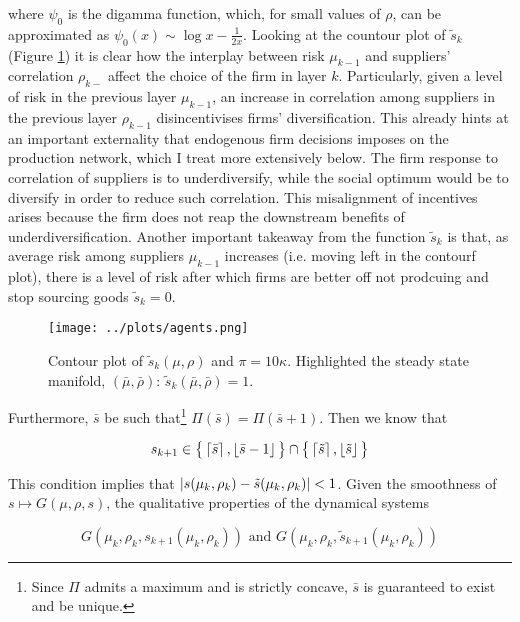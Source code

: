 \documentclass[../../main.tex]{subfiles}
\begin{document}
where $\psi_0$ is the digamma function, which, for small values of $\rho$, can be approximated as $\psi_0(x) \sim \log x - \frac{1}{2x}$. Looking at the countour plot of $\tilde{s}_k$ (Figure \ref{fig:agents-optimum}) it is clear how the interplay between risk $\mu_{k - 1}$ and suppliers' correlation $\rho_{k - }$ affect the choice of the firm in layer $k$. Particularly, given a level of risk in the previous layer $\mu_{k - 1}$, an increase in correlation among suppliers in the previous layer $\rho_{k - 1}$ disincentivises firms' diversification. This already hints at an important externality that endogenous firm decisions imposes on the production network, which I treat more extensively below. The firm response to correlation of suppliers is to underdiversify, while the social optimum would be to diversify in order to reduce such correlation. This misalignment of incentives arises because the firm does not reap the downstream benefits of underdiversification. Another important takeaway from the function $\tilde{s}_k$ is that, as average risk among suppliers $\mu_{k - 1}$ increases (i.e. moving left in the contourf plot), there is a level of risk after which firms are better off not prodcuing and stop sourcing goods $\tilde{s}_k = 0$.

\begin{figure}[H]
  \centering
  \texttt{[image: ../plots/agents.png]}
  \caption{Contour plot of $\tilde{s}_k(\mu, \rho)$ and $\pi = 10 \kappa$. Highlighted the steady state manifold, $(\bar{\mu}, \bar{\rho})$: $\tilde{s}_k(\bar{\mu}, \bar{\rho}) = 1$.}
  \label{fig:agents-optimum}
\end{figure}

\iffalse
  Furthermore, $\bar{s}$ be such that\footnote{Since $\Pi$ admits a maximum and is strictly concave, $\bar{s}$ is guaranteed to exist and be unique.} $\Pi(\bar{s}) = \Pi(\bar{s} + 1)$. Then we know that 

  \begin{equation}
    s_{k + 1} \in \big\{ \left\lceil\bar{s}\right\rceil, \left\lfloor\bar{s} - 1\right\rfloor \big\} \cap \big\{ \left\lceil\tilde{s}\right\rceil, \left\lfloor\tilde{s}\right\rfloor \big\}
  \end{equation}

  This condition implies that $\left\lvert s(\mu_k, \rho_k) - \tilde{s}(\mu_k, \rho_k)\right\rvert < 1$. Given the smoothness of $s \mapsto G(\mu, \rho, s)$, the qualitative properties of the dynamical systems

  \begin{equation*}
      G(\mu_k, \rho_k, s_{k + 1}(\mu_k, \rho_k)) \text{ and } G(\mu_k, \rho_k, \tilde{s}_{k + 1}(\mu_k, \rho_k))
  \end{equation*}
\end{document}
